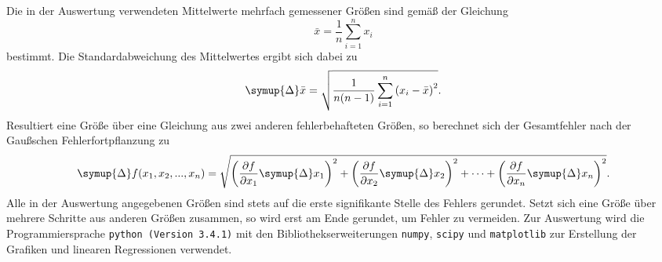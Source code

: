 Die in der Auswertung verwendeten Mittelwerte mehrfach gemessener Größen sind gemäß der Gleichung
%
\begin{equation}
    \bar{x}=\frac{1}{n}\sum_{i=1}^n x_i
    \label{eq:mittelwert}
\end{equation}
%
bestimmt.
Die Standardabweichung des Mittelwertes ergibt sich dabei zu
%
\begin{equation}
    \symup{\Delta}\bar{x}=\sqrt{\frac{1}{n(n-1)}\sum_{i=1}^n\left(x_i-\bar{x}\right)^2}.
    \label{eq:standardabweichung}
\end{equation}
%
Resultiert eine Größe über eine Gleichung aus zwei anderen fehlerbehafteten Größen, so berechnet sich der Gesamtfehler nach der Gaußschen Fehlerfortpflanzung zu
%
\begin{equation}
    \symup{\Delta}f(x_1,x_2,...,x_n)=\sqrt{\left(\frac{\partial f}{\partial x_1}\symup{\Delta}x_1\right)^2+\left(\frac{\partial f}{\partial x_2}\symup{\Delta}x_2\right)^2+ \dotsb +\left(\frac{\partial f}{\partial x_n}\symup{\Delta}x_n\right)^2}.
    \label{eq:fehlerfortpflanzung}
\end{equation}
%
Alle in der Auswertung angegebenen Größen sind stets auf die erste signifikante Stelle des Fehlers gerundet.
Setzt sich eine Größe über mehrere Schritte aus anderen Größen zusammen, so wird erst am Ende gerundet, um Fehler zu vermeiden.
Zur Auswertung wird die Programmiersprache \texttt{python (Version 3.4.1)}
mit den Bibliothekserweiterungen \texttt{numpy}, \texttt{scipy} und \texttt{matplotlib} zur Erstellung der Grafiken und linearen Regressionen verwendet.
